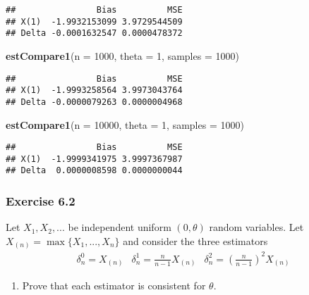 \documentclass[12pt,]{article}
\newenvironment{Shaded}{\begin{snugshade}}{\end{snugshade}}
\newcommand{\DataTypeTok}[1]{\textcolor[rgb]{0.13,0.29,0.53}{#1}}
\newcommand{\DecValTok}[1]{\textcolor[rgb]{0.00,0.00,0.81}{#1}}
\newcommand{\KeywordTok}[1]{\textcolor[rgb]{0.13,0.29,0.53}{\textbf{#1}}}
\newcommand{\NormalTok}[1]{#1}
\providecommand{\tightlist}{%
  \setlength{\itemsep}{0pt}\setlength{\parskip}{0pt}}
\begin{document}
\begin{verbatim}
##                Bias          MSE
## X(1)  -1.9932153099 3.9729544509
## Delta -0.0001632547 0.0000478372
\end{verbatim}

\begin{Shaded}
\begin{Highlighting}[]
\KeywordTok{estCompare1}\NormalTok{(}\DataTypeTok{n =} \DecValTok{1000}\NormalTok{, }\DataTypeTok{theta =} \DecValTok{1}\NormalTok{, }\DataTypeTok{samples =} \DecValTok{1000}\NormalTok{)}
\end{Highlighting}
\end{Shaded}

\begin{verbatim}
##                Bias          MSE
## X(1)  -1.9993258564 3.9973043764
## Delta -0.0000079263 0.0000004968
\end{verbatim}

\begin{Shaded}
\begin{Highlighting}[]
\KeywordTok{estCompare1}\NormalTok{(}\DataTypeTok{n =} \DecValTok{10000}\NormalTok{, }\DataTypeTok{theta =} \DecValTok{1}\NormalTok{, }\DataTypeTok{samples =} \DecValTok{1000}\NormalTok{)}
\end{Highlighting}
\end{Shaded}

\begin{verbatim}
##                Bias          MSE
## X(1)  -1.9999341975 3.9997367987
## Delta  0.0000008598 0.0000000044
\end{verbatim}

\hypertarget{exercise-6.2}{%
\subsubsection{Exercise 6.2}\label{exercise-6.2}}

Let \(X_1, X_2,...\) be independent uniform \((0,\theta)\) random
variables. Let \(X_{(n)}=\max\{X_1,...,X_n\}\) and consider the three
estimators \begin{align*}
\delta_n^0=X_{(n)} & \delta_n^1=\frac{n}{n-1}X_{(n)} & \delta_n^2=\left(\frac{n}{n-1}\right)^2X_{(n)}
\end{align*}

\begin{enumerate}
\def\labelenumi{(\alph{enumi})}
\tightlist
\item
  Prove that each estimator is consistent for \(\theta.\)
\end{enumerate}
\end{document}
